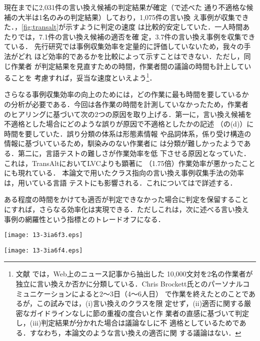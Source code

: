 現在までに2,031件の言い換え候補の判定結果が確定（で述べた
  通り不適格な候補の大半は1名のみの判定結果）しており，1,075件の言い換
え事例が収集できた．，\ref{fig:transalt}が示すように判定の速度
は比較的安定していた．一人時間あたりでは，7.1件の言い換え候補の適否を確
定，3.7件の言い換え事例を収集できている．
先行研究では事例収集効率を定量的に評価していないため，我々の手法がどれ
ほど効率的であるかを比較によって示すことはできない．ただし，同じ作業者
が判定結果を見直すための時間，作業者間の議論の時間も計上していることを
考慮すれば，妥当な速度といえよう\footnote{文献
  \cite{brockett:05,dolan:05}では，Web上のニュース記事から抽出した
  10,000文対を2名の作業者が独立に言い換えか否かに分類している．Chris
  Brockett氏とのパーソナルコミュニケーションによると2〜3日（4〜6人日）
  で作業を終えたとのことであるが，この試みでは，(i)言い換えのクラスを限
  定せず，(ii)適否に関する厳密なガイドラインなしに節の重複の度合いと作
  業者の直感に基づいて判定し，(iii)判定結果が分かれた場合は議論なしに不
  適格としているためである．すなわち，本論文のような言い換えの適否に関
  する議論はない．}．

さらなる事例収集効率の向上のためには，どの作業に最も時間を要しているか
の分析が必要である．今回は各作業の時間を計測していなかったため，作業者
のヒアリングに基づいて次の2つの原因を取り上げる．第一に，言い換え候補を
不適格とした場合にどのような誤りが原因で不適格としたかの記述
（の(d)）に時間を要していた．誤り分類の体系は形態素情報
や品詞体系，係り受け構造の情報に基づいているため，馴染みのない作業者に
は分類が難しかったようである．第二に，言語テストの難しさが作業効率を低
下させる原因となっていた．これは，TransAltにおいてLVCよりも顕著に
（1.75倍）作業効率が悪かったことにも現れている．
本論文で用いたクラス指向の言い換え事例収集手法の効率は，用いている言語
テストにも影響される．これについてはで詳述する．

ある程度の時間をかけても適否が判定できなかった場合に判定を保留すること
にすれば，さらなる効率化は実現できる．ただしこれは，次に述べる言い換え
事例の網羅性という指標とのトレードオフになる．

\begin{figure*}[t]
\parbox[t]{.5\textwidth}{
\leavevmode
\begin{center}
    \texttt{[image: 13-3ia6f3.eps]}
\caption{適否を判定した言い換え候補の数および\\その判定結果の内訳（LVC）
  \\各線の意味はを参照されたい．}
\label{fig:lvc}
\end{center}}
\parbox[t]{.5\textwidth}{
\leavevmode
\begin{center}
    \texttt{[image: 13-3ia6f4.eps]}
\caption{適否を判定した言い換え候補の数および\\その判定結果の内訳
  （TransAlt）\\各線の意味はを参照されたい．}
\label{fig:transalt}
\end{center}}
\end{figure*}

